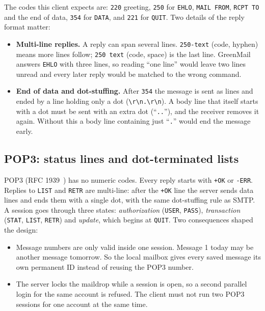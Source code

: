 \documentclass[11pt,a4paper]{article}
\begin{document}
The codes this client expects are: \texttt{220} greeting, \texttt{250} for
\texttt{EHLO}, \texttt{MAIL FROM}, \texttt{RCPT TO} and the end of data, \texttt{354} for
\texttt{DATA}, and \texttt{221} for \texttt{QUIT}. Two details of the reply format matter:

\begin{itemize}
  \item \textbf{Multi-line replies.} A reply can span several lines. \texttt{250-text} (code,
        hyphen) means more lines follow; \texttt{250 text} (code, space) is the last line.
        GreenMail answers \texttt{EHLO} with three lines, so reading ``one line'' would
        leave two lines unread and every later reply would be matched to the wrong command.
  \item \textbf{End of data and dot-stuffing.} After \texttt{354} the message is sent as
        lines and ended by a line holding only a dot (\verb|\r\n.\r\n|). A body line that
        itself starts with a dot must be sent with an extra dot (``\texttt{..}''), and the
        receiver removes it again. Without this a body line containing just ``\texttt{.}''
        would end the message early.
\end{itemize}

\subsection{POP3: status lines and dot-terminated lists}

POP3 (RFC 1939~\cite{rfc1939}) has no numeric codes. Every reply starts with
\texttt{+OK} or \texttt{-ERR}. Replies to \texttt{LIST} and \texttt{RETR} are multi-line:
after the \texttt{+OK} line the server sends data lines and ends them with a single dot,
with the same dot-stuffing rule as SMTP. A session goes through three states:
\emph{authorization} (\texttt{USER}, \texttt{PASS}), \emph{transaction} (\texttt{STAT},
\texttt{LIST}, \texttt{RETR}) and \emph{update}, which begins at \texttt{QUIT}. Two
consequences shaped the design:

\begin{itemize}
  \item Message numbers are only valid inside one session. Message 1 today may be another
        message tomorrow. So the local mailbox gives every saved message its own permanent
        ID instead of reusing the POP3 number.
  \item The server locks the maildrop while a session is open, so a second parallel login
        for the same account is refused. The client must not run two POP3 sessions for one
        account at the same time.
\end{itemize}
\end{document}

